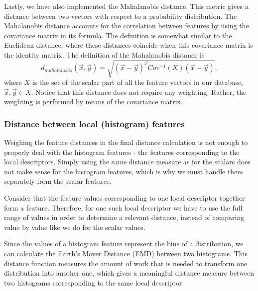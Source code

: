 Lastly, we have also implemented the Mahalanobis distance.
This metric gives a distance between two vectors with respect to a probability distribution.
The Mahalanobis distance accounts for the correlation between features by using the covariance matrix in its formula.
The definition is somewhat similar to the Euclidean distance, where these distances coincide when this covariance matrix is the identity matrix.
The definition of the Mahalanobis distance is
\begin{equation}
    d_{mahalanobis}(\overrightarrow{x}, \overrightarrow{y}) = \sqrt{(\overrightarrow{x} - \overrightarrow{y})^T Cov^{-1}(X) (\overrightarrow{x} - \overrightarrow{y})},
\end{equation}
where $X$ is the set of the scalar part of all the feature vectors in our database, $\overrightarrow{x}, \overrightarrow{y} \in X$.
Notice that this distance does not require any weighting.
Rather, the weighting is performed by means of the covariance matrix.

\subsubsection{Distance between local (histogram) features}\label{subsubsec:hist_distance}
Weighing the feature distances in the final distance calculation is not enough to properly deal with the histogram
features - the features corresponding to the local descriptors.
Simply using the same distance measure as for the scalars does not make sense for the histogram features, which is why
we must handle them separately from the scalar features.

Consider that the feature values corresponding to one local descriptor together form a feature.
Therefore, for one such local descriptor we have to use the full range of values in order to determine a relevant
distance, instead of comparing value by value like we do for the scalar values.

Since the values of a histogram feature represent the bins of a distribution, we can calculate the Earth's Mover
Distance (EMD) \cite{rubner_emd_2000} between two histograms.
This distance function measures the amount of work that is needed to transform one distribution into another one,
which gives a meaningful distance measure between two histograms corresponding to the same local descriptor.


